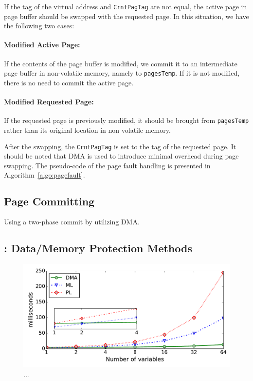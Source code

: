 If the tag of the virtual address and \texttt{CrntPagTag} are not equal, the active page in page buffer should be swapped with the requested page. In this situation, we have the following two cases:
\paragraph{Modified Active Page:} If the contents of the page buffer is modified, we commit it to an intermediate page buffer in non-volatile memory, namely to \texttt{pagesTemp}. If it is not modified, there is no need to commit the active page.

\paragraph{Modified Requested Page:}  If the requested page is previously modified, it should be brought from \texttt{pagesTemp} rather than its original location in non-volatile memory. 

After the swapping, the \texttt{CrntPagTag} is set to the tag of the requested page. It should be noted that DMA is used to introduce minimal overhead during page swapping. The pseudo-code of the page fault handling is presented in Algorithm~\ref{algo:pagefault}.



\subsection{Page Committing}

Using a two-phase commit by utilizing DMA. 


\subsection{\sys: Data/Memory Protection Methods}

\begin{figure}[t]
	\centering
	\includegraphics[width=0.8\columnwidth]{figures/iposCommitSize}
	\caption{...}
	\label{fig:virtOperationalBuf}
\end{figure}


